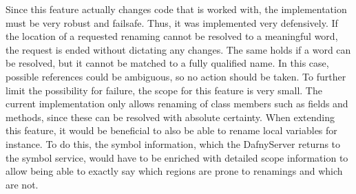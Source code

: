 Since this feature actually changes code that is worked with, the implementation must be very robust and failsafe. Thus, it was implemented very defensively. If the location of a requested renaming cannot be resolved to a meaningful word, the request is ended without dictating any changes. The same holds if a word can be resolved, but it cannot be matched to a fully qualified name. In this case, possible references could be ambiguous, so no action should be taken. To further limit the possibility for failure, the scope for this feature is very small. The current implementation only allows renaming of class members such as fields and methods, since these can be resolved with absolute certainty.\newline
When extending this feature, it would be beneficial to also be able to rename local variables for instance. To do this, the symbol information, which the DafnyServer returns to the symbol service, would have to be enriched with detailed scope information to allow being able to exactly say which regions are prone to renamings and which are not. 
